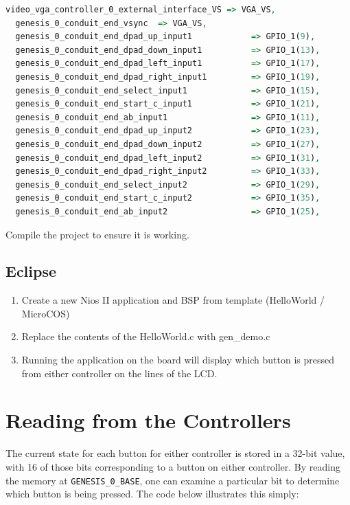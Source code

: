 \documentclass{capstonedoc}
\begin{document}
\begin{lstlisting}[language={vhdl},caption={Port Map Configuration},label={lst:port_map}]
  video_vga_controller_0_external_interface_VS => VGA_VS,
  genesis_0_conduit_end_vsync  => VGA_VS,
  genesis_0_conduit_end_dpad_up_input1            => GPIO_1(9),
  genesis_0_conduit_end_dpad_down_input1          => GPIO_1(13),
  genesis_0_conduit_end_dpad_left_input1          => GPIO_1(17),
  genesis_0_conduit_end_dpad_right_input1         => GPIO_1(19),
  genesis_0_conduit_end_select_input1             => GPIO_1(15),
  genesis_0_conduit_end_start_c_input1            => GPIO_1(21),
  genesis_0_conduit_end_ab_input1                 => GPIO_1(11),
  genesis_0_conduit_end_dpad_up_input2            => GPIO_1(23),
  genesis_0_conduit_end_dpad_down_input2          => GPIO_1(27),
  genesis_0_conduit_end_dpad_left_input2          => GPIO_1(31),
  genesis_0_conduit_end_dpad_right_input2         => GPIO_1(33),
  genesis_0_conduit_end_select_input2             => GPIO_1(29),
  genesis_0_conduit_end_start_c_input2            => GPIO_1(35),
  genesis_0_conduit_end_ab_input2                 => GPIO_1(25),
\end{lstlisting}

Compile the project to ensure it is working. 

\subsection{Eclipse}

\begin{enumerate}
  \item Create a new Nios II application and BSP from template (HelloWorld / MicroCOS)
  \item Replace the contents of the HelloWorld.c with gen\_demo.c
  \item Running the application on the board will display which button 
is pressed from either controller on the lines of the LCD.
\end{enumerate}

\section{Reading from the Controllers}

The current state for each button for either controller is stored 
in a 32-bit value, with 16 of those bits corresponding to a button 
on either controller. By reading the memory at \texttt{GENESIS\_0\_BASE}, 
one can examine a particular bit to determine which button is being 
pressed. The code below illustrates this simply: 
\end{document}
